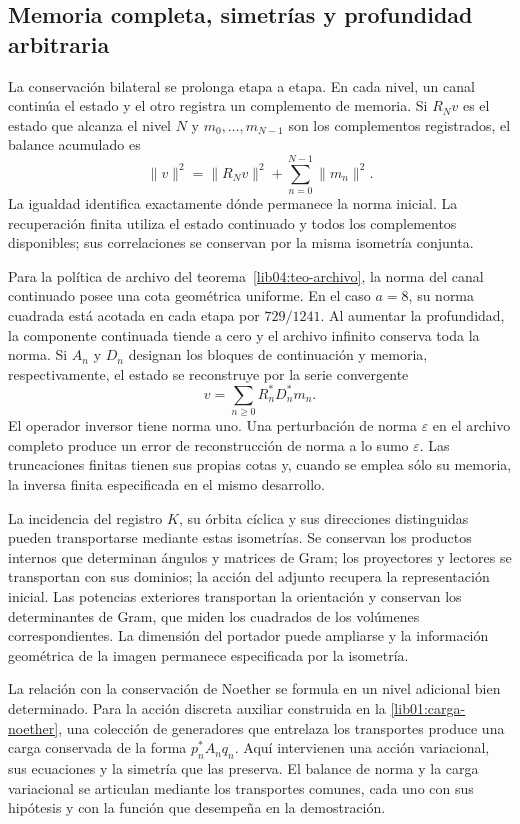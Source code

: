 \subsection*{Memoria completa, simetrías y profundidad arbitraria}
\label{libnar:memoria}

La conservación bilateral se prolonga etapa a etapa. En cada nivel,
un canal continúa el estado y el otro registra un complemento de
memoria. Si \(R_Nv\) es el estado que alcanza el nivel \(N\) y
\(m_0,\ldots,m_{N-1}\) son los complementos registrados, el
balance acumulado es
\[
 \|v\|^2=\|R_Nv\|^2+\sum_{n=0}^{N-1}\|m_n\|^2.
\]
La igualdad identifica exactamente dónde permanece la norma
inicial. La recuperación finita utiliza el estado continuado y
todos los complementos disponibles; sus correlaciones se conservan
por la misma isometría conjunta.

Para la política de archivo del teorema~\ref{lib04:teo-archivo}, la
norma del canal continuado posee una cota geométrica uniforme.
En el caso \(a=8\), su norma cuadrada está acotada en cada etapa
por \(729/1241\). Al aumentar la profundidad, la componente
continuada tiende a cero y el archivo infinito conserva toda la
norma. Si \(A_n\) y \(D_n\) designan los bloques de
continuación y memoria, respectivamente, el estado se reconstruye
por la serie convergente
\[
 v=\sum_{n\geq0}R_n^*D_n^*m_n.
\]
El operador inversor tiene norma uno. Una perturbación de norma
\(\varepsilon\) en el archivo completo produce un error de
reconstrucción de norma a lo sumo \(\varepsilon\). Las
truncaciones finitas tienen sus propias cotas y, cuando se emplea
sólo su memoria, la inversa finita especificada en el mismo
desarrollo.

La incidencia del registro \(K\), su órbita cíclica y sus
direcciones distinguidas pueden transportarse mediante estas
isometrías. Se conservan los productos internos que determinan
ángulos y matrices de Gram; los proyectores y lectores se
transportan con sus dominios; la acción del adjunto recupera la
representación inicial. Las potencias exteriores transportan la
orientación y conservan los determinantes de Gram, que miden los
cuadrados de los volúmenes correspondientes. La dimensión del
portador puede ampliarse y la información geométrica de la
imagen permanece especificada por la isometría.

La relación con la conservación de Noether se formula en un nivel
adicional bien determinado. Para la acción discreta auxiliar
construida en la \cref{lib01:carga-noether}, una colección de
generadores que entrelaza los transportes produce una carga
conservada de la forma \(p_n^*A_nq_n\). Aquí intervienen una
acción variacional, sus ecuaciones y la simetría que las preserva.
El balance de norma y la carga variacional se articulan mediante
los transportes comunes, cada uno con sus hipótesis y con la
función que desempeña en la demostración.

